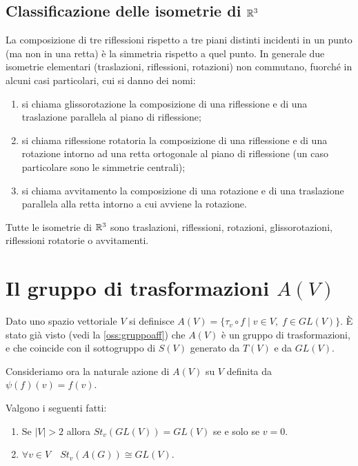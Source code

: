  \subsection{Classificazione delle isometrie di $\mathbb R^3$}
  
 \begin{remark}
 La composizione di tre riflessioni rispetto a tre piani distinti incidenti in un punto (ma non in una retta)
 è la simmetria rispetto a quel punto.
 In generale due isometrie elementari (traslazioni, riflessioni, rotazioni) non commutano, fuorché in alcuni casi particolari,
 cui si danno dei nomi:
 \begin{enumerate}[label=\bf\Roman*)]
  \item  si chiama glissorotazione la composizione di una riflessione e di una traslazione parallela al piano di riflessione;
  \item si chiama riflessione rotatoria la composizione di una riflessione e di una rotazione intorno ad una retta ortogonale
  al piano di riflessione (un caso particolare sono le simmetrie centrali);
  \item si chiama avvitamento la composizione di una rotazione e di una traslazione parallela alla retta intorno a cui
  avviene la rotazione.
 \end{enumerate}
 \end{remark}
 
 \begin{theorem}
 Tutte le isometrie di $\mathbb R^3$ sono traslazioni, riflessioni, rotazioni, glissorotazioni, riflessioni rotatorie
 o avvitamenti.
 \end{theorem}
 
  \section{Il gruppo di trasformazioni $A(V)$}
 
 Dato uno spazio vettoriale $V$ si definisce $A(V)=\{\tau_v\circ f\;|\; v\in V,\; f\in GL(V)\}$.
 È stato già visto (vedi la \cref{oss:gruppoaff}) che $A(V)$ è un gruppo di trasformazioni, e che coincide con il sottogruppo di $S(V)$
 generato da $T(V)$ e da $GL(V)$.
 
 \vspace{0.5cm}
 
 Consideriamo ora la naturale azione di $A(V)$ su $V$ definita da $\psi(f)(v)=f(v)$.
 \begin{proposition} Valgono i seguenti fatti:
 \begin{enumerate}[label=\Roman*)]
	 \item Se $|V|>2$ allora $St_v(GL(V))=GL(V)$ se e solo se $v=0$.\label{enum:stab1}
	 \item $\forall v\in V\quad St_v(A(G))\cong GL(V)$.\label{enum:stab2}
	\end{enumerate} 
 \end{proposition}
 
